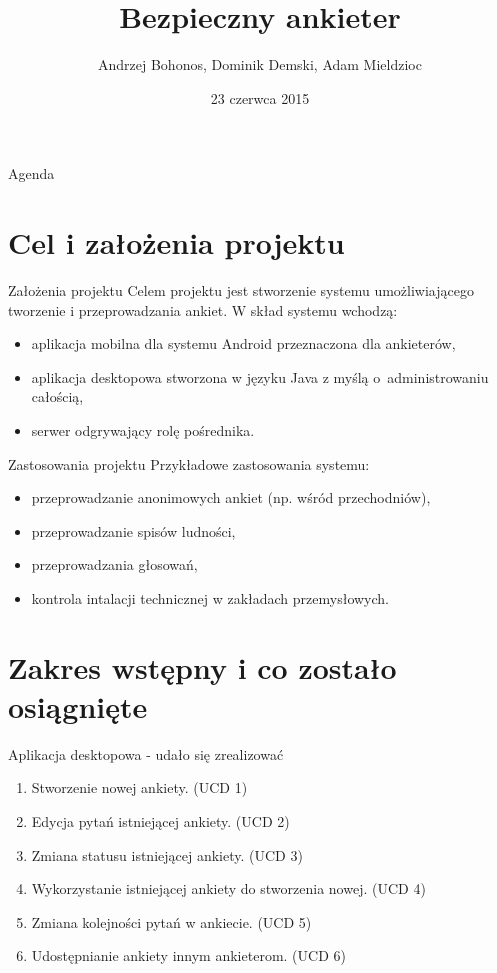 \documentclass[a4paper,10pt]{beamer}
\date{23 czerwca 2015}
\title{Bezpieczny ankieter}
\author[A. Bohonos, D. Demski, A. Mieldzioc]{Andrzej Bohonos, Dominik Demski, Adam Mieldzioc}
\begin{document}
		\begin{frame}
			\titlepage
		\end{frame}
		\begin{frame}{Agenda}
			\tableofcontents
		\end{frame}
		
		\section{Cel i założenia projektu}
		\begin{frame}{Założenia projektu}
			Celem projektu jest stworzenie systemu umożliwiającego tworzenie i przeprowadzania ankiet. W skład systemu wchodzą:
			\begin{itemize}
				\item aplikacja mobilna dla systemu Android przeznaczona dla ankieterów,
				\item aplikacja desktopowa stworzona w języku Java z myślą o administrowaniu całością,
				\item serwer odgrywający rolę pośrednika.
			\end{itemize}
		\end{frame}
		
		
		\begin{frame}{Zastosowania projektu}
			Przykładowe zastosowania systemu:
			\begin{itemize}
				\item przeprowadzanie anonimowych ankiet (np. wśród przechodniów),
				\item przeprowadzanie spisów ludności,
				\item przeprowadzania głosowań,
				\item kontrola intalacji technicznej w zakładach przemysłowych.
			\end{itemize}
		\end{frame}
	
		\section{Zakres wstępny i co zostało osiągnięte}
	
		\begin{frame}{Aplikacja desktopowa - udało się zrealizować}
			\begin{enumerate}
				\item  Stworzenie nowej ankiety. (UCD 1)
				\item	Edycja pytań istniejącej ankiety. (UCD 2)
				\item	Zmiana statusu istniejącej ankiety. (UCD 3)
				\item	Wykorzystanie istniejącej ankiety do stworzenia nowej. (UCD 4)
				\item	Zmiana kolejności pytań w ankiecie. (UCD 5)
				\item	Udostępnianie ankiety innym ankieterom. (UCD 6)	
			\end{enumerate}
		\end{frame}
		
\end{document}
